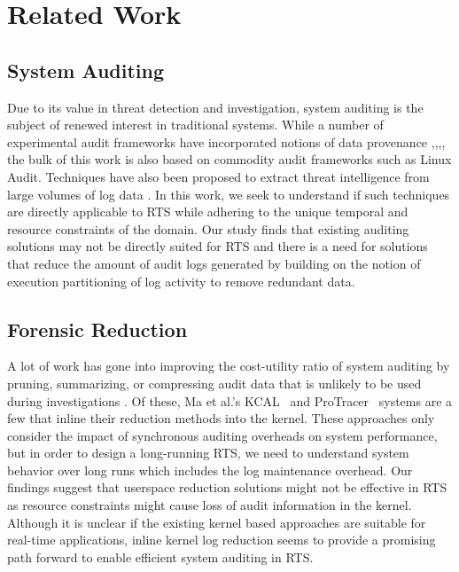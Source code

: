 \section{Related Work}

\subsection{System Auditing}
Due to its value in threat detection and investigation, system auditing is the subject of renewed interest in traditional systems. While a number of experimental audit frameworks have incorporated notions of data provenance \cite{Bates2015},\cite{Pasquier2017b},\cite{Pohly2012},\cite{Pasquier2017a}, the bulk of this work is also based on commodity audit frameworks such as Linux Audit. Techniques have also been proposed to extract threat intelligence from large volumes of log data \cite{Pei2016,203676,Kwon2018,Hassan2019}. In this work, we seek to understand if such techniques are directly applicable to RTS while adhering to the unique temporal and resource constraints of the domain. Our study finds that existing auditing solutions may not be directly suited for RTS and there is a need for solutions that reduce the amount of audit logs generated by building on the notion of execution partitioning of log activity \cite{Kwon2018,Hassan2019,Hassan2020,Ma2017,Lee2013a} to remove redundant data.

\subsection{Forensic Reduction}
 A lot of work has gone into improving the cost-utility ratio of system auditing by pruning, summarizing, or compressing audit data that is unlikely to be used during investigations \cite{Tang2018,Xu2016,Ma2015,Ben2018,Hassan2018a,Bates2015a,Bates2017b,Hossain2018,Lee2013}. Of these, Ma et al.'s KCAL~\cite{Ma2018} and ProTracer~\cite{Ma2016} systems are a few that inline their reduction methods into the kernel. These approaches only consider the impact of synchronous auditing overheads on system performance, but in order to design a long-running RTS, we need to understand system behavior over long runs which includes the log maintenance overhead. Our findings suggest that userspace reduction solutions might not be effective in RTS as resource constraints might cause loss of audit information in the kernel. Although it is unclear if the existing kernel based approaches are suitable for real-time applications, inline kernel log reduction seems to provide a promising path forward to enable efficient system auditing in RTS.

